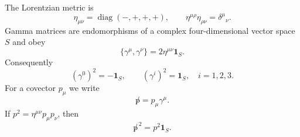 \begin{definition}
\label{def:four-dimensional-mostly-plus-spinor-convention}
The Lorentzian metric is
\[
  \eta_{\mu\nu}=\operatorname{diag}(-,+,+,+),
  \qquad
  \eta^{\mu\rho}\eta_{\rho\nu}=\delta^\mu{}_\nu .
\]
Gamma matrices are endomorphisms of a complex four-dimensional vector space
\(S\) and obey
\begin{equation}
  \{\gamma^\mu,\gamma^\nu\}=2\eta^{\mu\nu}\mathbf 1_S .
  \label{eq:appendix-lorentz-clifford}
\end{equation}
Consequently
\[
  (\gamma^0)^2=-\mathbf 1_S,
  \qquad
  (\gamma^i)^2=\mathbf 1_S,\quad i=1,2,3 .
\]
For a covector \(p_\mu\) we write
\[
  \not p=p_\mu\gamma^\mu .
\]
If \(p^2=\eta^{\mu\nu}p_\mu p_\nu\), then
\[
  \not p^{\,2}=p^2\mathbf 1_S .
\]


\end{definition}
